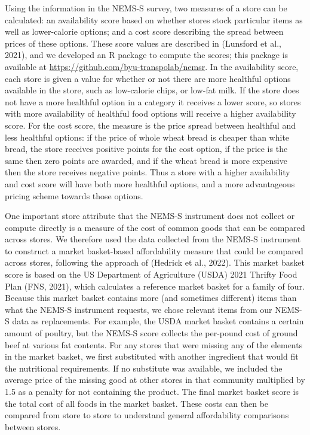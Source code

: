 \documentclass[
  letterpaper,
  number,
  review,
  3p]{elsarticle}
\begin{document}
Using the information in the NEMS-S survey, two measures of a store can
be calculated: an availability score based on whether stores stock
particular items as well as lower-calorie options; and a cost score
describing the spread between prices of these options. These score
values are described in (Lunsford et al., 2021), and we developed an R
package to compute the scores; this package is available at
\url{https://github.com/byu-transpolab/nemsr}. In the availability
score, each store is given a value for whether or not there are more
healthful options available in the store, such as low-calorie chips, or
low-fat milk. If the store does not have a more healthful option in a
category it receives a lower score, so stores with more availability of
healthful food options will receive a higher availability score. For the
cost score, the measure is the price spread between healthful and less
healthful options: if the price of whole wheat bread is cheaper than
white bread, the store receives positive points for the cost option, if
the price is the same then zero points are awarded, and if the wheat
bread is more expensive then the store receives negative points. Thus a
store with a higher availability and cost score will have both more
healthful options, and a more advantageous pricing scheme towards those
options.

One important store attribute that the NEMS-S instrument does not
collect or compute directly is a measure of the cost of common goods
that can be compared across stores. We therefore used the data collected
from the NEMS-S instrument to construct a market basket-based
affordability measure that could be compared across stores, following
the approach of (Hedrick et al., 2022). This market basket score is
based on the US Department of Agriculture (USDA) 2021 Thrifty Food Plan
(FNS, 2021), which calculates a reference market basket for a family of
four. Because this market basket contains more (and sometimes different)
items than what the NEMS-S instrument requests, we chose relevant items
from our NEMS-S data as replacements. For example, the USDA market
basket contains a certain amount of poultry, but the NEMS-S score
collects the per-pound cost of ground beef at various fat contents. For
any stores that were missing any of the elements in the market basket,
we first substituted with another ingredient that would fit the
nutritional requirements. If no substitute was available, we included
the average price of the missing good at other stores in that community
multiplied by 1.5 as a penalty for not containing the product. The final
market basket score is the total cost of all foods in the market basket.
These costs can then be compared from store to store to understand
general affordability comparisons between stores.
\end{document}
